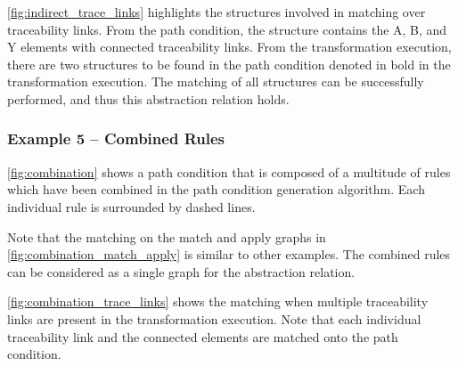 \cref{fig:indirect_trace_links} highlights the structures involved in matching over traceability links. From the path condition, the structure contains the A, B, and Y elements with connected traceability links. From the transformation execution, there are two structures to be found in the path condition denoted in bold in the transformation execution. The matching of all structures can be successfully performed, and thus this abstraction relation holds.





\subsubsection{Example 5 -- Combined Rules}



\cref{fig:combination} shows a path condition that is composed of a multitude of rules which have been combined in the path condition generation algorithm. Each individual rule is surrounded by dashed lines.

Note that the matching on the match and apply graphs in \cref{fig:combination_match_apply} is similar to other examples. The combined rules can be considered as a single graph for the abstraction relation.

\cref{fig:combination_trace_links} shows the matching when multiple traceability links are present in the transformation execution. Note that each individual traceability link and the connected elements are matched onto the path condition.

